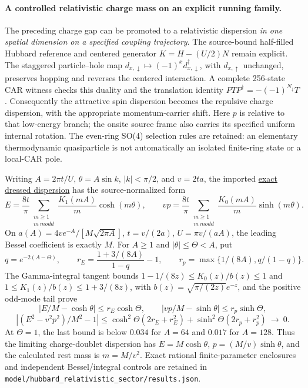 \paragraph{A controlled relativistic charge mass on an explicit running family.}
The preceding charge gap can be promoted to a relativistic dispersion
\emph{in one spatial dimension on a specified coupling trajectory}.
The source-bound half-filled Hubbard reference and centered generator
$K=H-(U/2)N$ remain explicit.  The staggered particle--hole map
$d_{x,\downarrow}\mapsto(-1)^x d^\dagger_{x,\downarrow}$, with
$d_{x,\uparrow}$ unchanged, preserves hopping and reverses the centered
interaction.  A complete 256-state CAR witness checks this duality and
the translation identity $PTP^\dagger=-(-1)^{N_\downarrow}T$.
Consequently the attractive spin dispersion becomes the repulsive charge
dispersion, with the appropriate momentum-carrier shift.  Here $p$ is
relative to that low-energy branch; the onsite source frame also carries
its specified uniform internal rotation.  The even-ring SO(4) selection
rules are retained: an elementary thermodynamic quasiparticle is not
automatically an isolated finite-ring state or a local-CAR pole.

Writing $A=2\pi t/U$, $\theta=A\sin k$, $|k|<\pi/2$, and $v=2ta$,
the imported
\href{https://arxiv.org/html/cond-mat/9410043}{exact dressed dispersion}
has the source-normalized form
\[
 E=\frac{8t}\pi\sum_{\substack{m\ge1\\m\ {
m odd}}}
    \frac{K_1(mA)}m\cosh(m\theta),\qquad
 vp=\frac{8t}\pi\sum_{\substack{m\ge1\\m\ {
m odd}}}
    \frac{K_0(mA)}m\sinh(m\theta).
\]
On $a(A)=4v e^{-A}/[M\sqrt{2\pi A}]$, $t=v/(2a)$,
$U=\pi v/(aA)$, the leading Bessel coefficient is exactly $M$.
For $A\ge1$ and $|\theta|\le\Theta<A$, put
\[
 q=e^{-2(A-\Theta)},\qquad
 r_E=\frac{1+3/(8A)}{1-q}-1,\qquad
 r_p=\max\{1/(8A),q/(1-q)\}.
\]
The Gamma-integral tangent bounds
$1-1/(8z)\le K_0(z)/b(z)\le1$ and
$1\le K_1(z)/b(z)\le1+3/(8z)$, with
$b(z)=\sqrt{\pi/(2z)}e^{-z}$, and the positive odd-mode tail prove
\[
 |E/M-\cosh\theta|\le r_E\cosh\Theta,\qquad
 |vp/M-\sinh\theta|\le r_p\sinh\Theta,
\]
\[
 \left|(E^2-v^2p^2)/M^2-1\right|
 \le\cosh^2\Theta(2r_E+r_E^2)
   +\sinh^2\Theta(2r_p+r_p^2)\ \longrightarrow\ 0.
\]
At $\Theta=1$, the last bound is below $0.034$ for $A=64$ and
$0.017$ for $A=128$.  Thus the limiting charge-doublet dispersion has
$E=M\cosh\theta$, $p=(M/v)\sinh\theta$, and the calculated rest mass
is $m=M/v^2$.  Exact rational finite-parameter enclosures and independent
Bessel/integral controls are retained in
\texttt{model/hubbard\_relativistic\_sector/results.json}.

